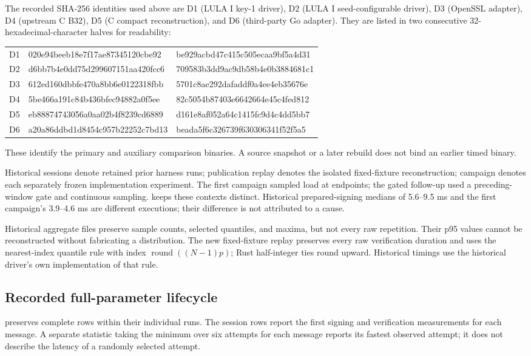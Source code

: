 \documentclass[a4paper,envcountsame,runningheads]{llncs}
\begin{document}
\FloatBarrier

The recorded SHA-256 identities used above are D1 (LULA I key-1 driver), D2 (LULA I seed-configurable driver), D3 (OpenSSL adapter), D4 (upstream C B32), D5 (C compact reconstruction), and D6 (third-party Go adapter). They are listed in two consecutive 32-hexadecimal-character halves for readability:
\begin{center}\scriptsize\ttfamily
\begin{tabular}{lll}
D1 & 020e94beeb18e7f17ae87345120cbe92 & be929acbd47c415c505ecaa9bf5a4d31\\
D2 & d6bb7b4e0dd75d299607151aa420fcc6 & 709583b3dd9ac9db58b4e0b3884681c1\\
D3 & 612ed160dbbfe470a8bb6e0122318fbb & 5701c8ae292dafaddf0a4ee4eb35676e\\
D4 & 5be466a191c84b436bfec94882a0f5ee & 82c5054b87403e6642664e45c4fed812\\
D5 & eb88874743056a0aa02b4f8239cd6889 & d161e8af052a64c1415fc9d4c4dd5bb7\\
D6 & a20a86ddbd1d8454c957b22252c7bd13 & beada5f6c326739f630306341f52f5a5\\
\end{tabular}\end{center}
These identify the primary and auxiliary comparison binaries. A source snapshot or a later rebuild does not bind an earlier timed binary.

Historical sessions denote retained prior harness runs; publication replay denotes the isolated fixed-fixture reconstruction; campaign denotes each separately frozen implementation experiment. The first campaign sampled load at endpoints; the gated follow-up used a preceding-window gate and continuous sampling.  keeps these contexts distinct. Historical prepared-signing medians of 5.6--9.5 ms and the first campaign's 3.9--4.6 ms are different executions; their difference is not attributed to a cause.

Historical aggregate files preserve sample counts, selected quantiles, and maxima, but not every raw repetition. Their p95 values cannot be reconstructed without fabricating a distribution. The new fixed-fixture replay preserves every raw verification duration and uses the nearest-index quantile rule with index $\operatorname{round}((N-1)p)$; Rust half-integer ties round upward. Historical timings use the historical driver's own implementation of that rule.

\subsection{Recorded full-parameter lifecycle}
 preserves complete rows within their individual runs. The session rows report the first signing and verification measurements for each message. A separate statistic taking the minimum over six attempts for each message reports its fastest observed attempt; it does not describe the latency of a randomly selected attempt.
\end{document}
